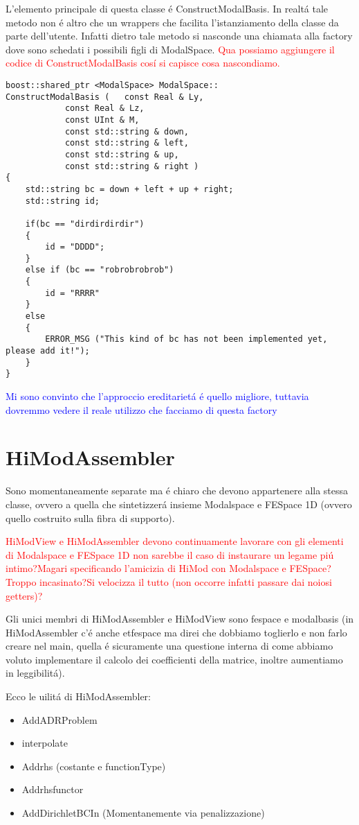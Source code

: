 L'elemento principale di questa classe \'e ConstructModalBasis. In realt\'a tale metodo non \'e altro che un wrappers che facilita l'istanziamento della classe da parte dell'utente. Infatti dietro tale metodo si nasconde una chiamata alla factory dove sono schedati i possibili figli di ModalSpace.
 \textcolor{red}{Qua possiamo aggiungere il codice di ConstructModalBasis cos\'i si capisce cosa nascondiamo.}


\begin{lstlisting}
boost::shared_ptr <ModalSpace> ModalSpace::
ConstructModalBasis ( 	const Real & Ly,
 			const Real & Lz, 
 			const UInt & M, 
 			const std::string & down, 
 			const std::string & left, 
 			const std::string & up, 
 			const std::string & right )
{
	std::string bc = down + left + up + right;
	std::string id;

	if(bc == "dirdirdirdir")
	{
		id = "DDDD";
	}
	else if (bc == "robrobrobrob")
	{
		id = "RRRR"
	}
	else
	{
		ERROR_MSG ("This kind of bc has not been implemented yet, please add it!");
	}
}
\end{lstlisting} 
 \textcolor{blue}{Mi sono convinto che l'approccio ereditariet\'a \'e quello migliore, tuttavia dovremmo vedere il reale utilizzo che facciamo di questa factory}
 
\section{HiModAssembler}
 
 Sono momentaneamente separate ma \'e chiaro che devono appartenere alla stessa classe, ovvero a quella che sintetizzer\'a insieme Modalspace e FESpace 1D (ovvero quello costruito sulla fibra di supporto).
 
 \textcolor{red}{HiModView e HiModAssembler devono continuamente lavorare con gli elementi di Modalspace e FESpace 1D non sarebbe il caso di instaurare un legame pi\'u intimo?Magari specificando l'amicizia di HiMod con Modalspace e FESpace?Troppo incasinato?Si velocizza il tutto (non occorre infatti passare dai noiosi getters)?}
 
Gli unici membri di HiModAssembler e HiModView sono fespace e modalbasis (in HiModAssembler c'\'e anche etfespace ma direi che dobbiamo toglierlo e non farlo creare nel main, quella \'e sicuramente una questione interna di come abbiamo voluto implementare il calcolo dei coefficienti della matrice, inoltre aumentiamo in leggibilit\'a).

Ecco le uilit\'a di HiModAssembler:
\begin{itemize}
\item AddADRProblem
\item interpolate
\item Addrhs (costante e functionType)
\item Addrhsfunctor
\item AddDirichletBCIn (Momentanemente via penalizzazione)
\end{itemize}

